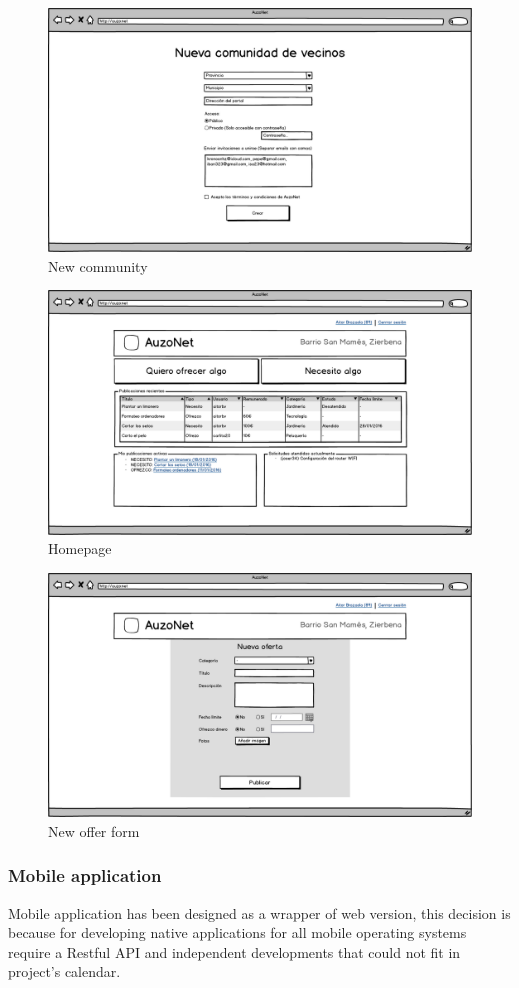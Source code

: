 \documentclass{DeustoFDP}
\begin{document}
\begin{figure}[h!]
	\centering
	\includegraphics[width=0.7\linewidth]{fig/mockups/newcommunity}
	\caption[New community]{New community}
	\label{fig:newcommunity}
\end{figure}

\begin{figure}[h!]
	\centering
	\includegraphics[width=0.7\linewidth]{fig/mockups/home}
	\caption[Homepage]{Homepage}
	\label{fig:home}
\end{figure}

\begin{figure}[h!]
	\centering
	\includegraphics[width=0.7\linewidth]{fig/mockups/newoffer}
	\caption[New offer form]{New offer form}
	\label{fig:newoffer}
\end{figure}
\newpage
\subsubsection{Mobile application}
Mobile application has been designed as a wrapper of web version, this decision is because for developing native applications for all mobile operating systems require a Restful API and independent developments that could not fit in project's calendar.
\end{document}

